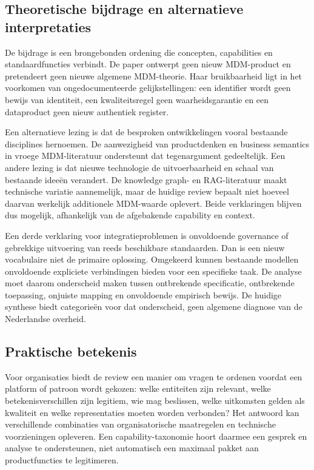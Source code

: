 \subsection{Theoretische bijdrage en alternatieve interpretaties}
De bijdrage is een brongebonden ordening die concepten, capabilities en standaardfuncties verbindt. De paper ontwerpt geen nieuw MDM-product en pretendeert geen nieuwe algemene MDM-theorie. Haar bruikbaarheid ligt in het voorkomen van ongedocumenteerde gelijkstellingen: een identifier wordt geen bewijs van identiteit, een kwaliteitsregel geen waarheidsgarantie en een dataproduct geen nieuw authentiek register.

Een alternatieve lezing is dat de besproken ontwikkelingen vooral bestaande disciplines hernoemen. De aanwezigheid van productdenken en business semantics in vroege MDM-literatuur ondersteunt dat tegenargument gedeeltelijk. Een andere lezing is dat nieuwe technologie de uitvoerbaarheid en schaal van bestaande ideeën verandert. De knowledge graph- en RAG-literatuur maakt technische variatie aannemelijk, maar de huidige review bepaalt niet hoeveel daarvan werkelijk additionele MDM-waarde oplevert. Beide verklaringen blijven dus mogelijk, afhankelijk van de afgebakende capability en context. \parencite{L20,L18,L13,L16}

Een derde verklaring voor integratieproblemen is onvoldoende governance of gebrekkige uitvoering van reeds beschikbare standaarden. Dan is een nieuw vocabulaire niet de primaire oplossing. Omgekeerd kunnen bestaande modellen onvoldoende expliciete verbindingen bieden voor een specifieke taak. De analyse moet daarom onderscheid maken tussen ontbrekende specificatie, ontbrekende toepassing, onjuiste mapping en onvoldoende empirisch bewijs. De huidige synthese biedt categorieën voor dat onderscheid, geen algemene diagnose van de Nederlandse overheid. \parencite{L07,S14,S08}

\subsection{Praktische betekenis}
Voor organisaties biedt de review een manier om vragen te ordenen voordat een platform of patroon wordt gekozen: welke entiteiten zijn relevant, welke betekenisverschillen zijn legitiem, wie mag beslissen, welke uitkomsten gelden als kwaliteit en welke representaties moeten worden verbonden? Het antwoord kan verschillende combinaties van organisatorische maatregelen en technische voorzieningen opleveren. Een capability-taxonomie hoort daarmee een gesprek en analyse te ondersteunen, niet automatisch een maximaal pakket aan productfuncties te legitimeren.

